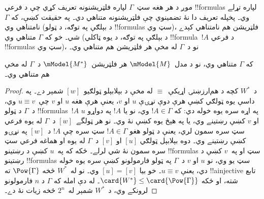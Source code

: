 \documentclass[../../../include/open-logic-section]{subfiles}
\begin{document}


موږ د هر هغه سټ~$\Gamma$ لپاره فلټريشنونه تعريف کړي چې د فرعي
!!{formula}s لپاره تړلے وي۔ پخپله تعريف دا نۀ تضمينوي چې
فلټريشنونه متناهي دي۔ په حقيقت کښې، که $\Gamma$ نامتناهي وي (د
بېلګې په توګه، د ټولو !!{formula}s سټ وي)، فلټريشن هم نامتناهي
کېدے شي۔ خو که $\Gamma$ متناهي وي (د بېلګې په توګه، د يوه ټاکلي
!!{formula}~$!A$ د فرعي !!{formula}s سټ وي)، نو د~$\Gamma$ له
مخې هر فلټريشن هم متناهي وي۔

\begin{prop}
  که $\Gamma$ متناهي وي، نو د مدل~$\mModel{M}$ هر
  فلټريشن~$\mModel{M^*}$ د~$\Gamma$ له مخې هم متناهي وي۔
\end{prop}

\begin{proof}
  د~$W^*$ کچه د هم‌ارزښتۍ اړيکې~$\equiv$ له مخې د بېلابېلو
  ټولګيو~$[w]$ شمېر دے۔ په داسې يوه ټولګي کښې هرې دوې نړۍې
  $u$ او $v$، يعنې هرې هغه $u$ او $v$ چې~$u \equiv v$ وي،
  د~$\Gamma$ د ټولو !!{formula}s~$!A$ په اړه سره يوه خوله دي:
  که $!A \in \Gamma$ وي، نو يا $!A$ په دواړو $u$ او $v$ کښې
  رښتينے وي، يا په هېڅ يوه کښې نۀ وي۔ نو هر ټولگے~$[w]$ د~$\Gamma$
  له يوه فرعي سټ سره سمون لري، يعنې د ټولو هغو $!A \in
  \Gamma$ سټ سره چې $!A$ د~$[w]$ په نړۍو کښې رښتينے وي۔
  دوه بېلابېل ټولګي $[u]$ او $[v]$ د~$\Gamma$ له يوه او هماغه
  فرعي سټ سره سمون نۀ شي لرلے۔ ځکه که په~$u$ کښې د رښتينو
  !!{formula}s سټ او په~$v$ کښې د رښتينو !!{formula}s سټ يو
  وي، نو $u$ او $v$ د~$\Gamma$ په ټولو فارمولونو کښې سره يوه
  خوله دي، يعنې $u \equiv v$۔ خو بيا $[u] = [v]$ وي۔ نو
  له~$W^*$ څخه $\Pow{\Gamma}$ ته !!a{injective} تابع شته، او
  ځکه $\card{W^*} \le \card{\Pow{\Gamma}}$۔ له دې امله که
  $\Gamma$ د $n$ فارمولونو لرونکے وي، د~$W^*$ شمېر له~$2^n$
  څخه زيات نۀ دے۔
\end{proof}
\end{document}
